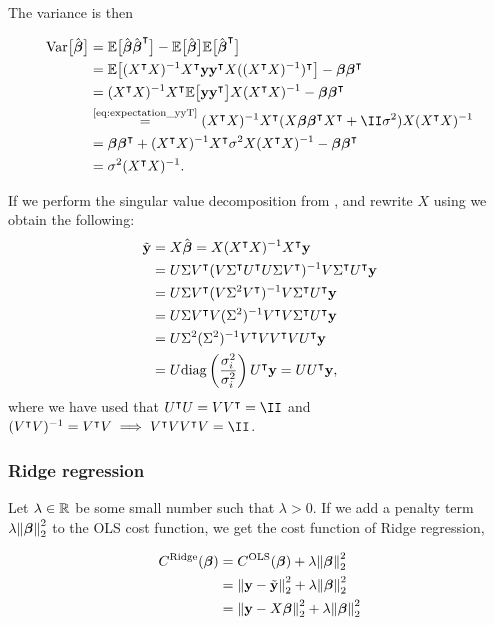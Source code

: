 The variance is then 

\begin{align}\label{eq:variance_of_optimal_beta_ols}\nonumber 
    \variance{\optbeta} &= \EE{\optbeta \optbeta\TT} -\EE{\optbeta} \EE{\optbeta\TT} \nonumber \\
    &= \EE{\invhessian X\TT  \vec{y} \vec{y}\TT X (\invhessian)\TT} - \svec{\beta} \svec{\beta}\TT \nonumber \\
    &= \invhessian X\TT \EE{ \vec{y} \vec{y}\TT } X \invhessian - \svec{\beta} \svec{\beta}\TT \nonumber \\
    &\stackrel{\text{\eqref{eq:expectation_yyT}}}{=}\invhessian X\TT ( X\svec{\beta} \svec{\beta}\TT X\TT+ \II\sigma^2) X \invhessian \nonumber \\
    &= \svec{\beta} \svec{\beta} \TT + \invhessian X\TT \sigma^2 X \invhessian - \svec{\beta} \svec{\beta} \TT \nonumber \\
    &= \sigma^2 \invhessian.
\end{align}

If we perform the singular value decomposition from , and rewrite $X$ using  we obtain the following:
\begin{align}\label{eq:ols_svd}
    \tilde{\mathbf{y}} &= X\hat{\boldsymbol{\beta}} = X(X^\intercal X)^{-1} X^\intercal \mathbf{y} \nonumber\\
    &= U\Sigma V^\intercal(V\Sigma^\intercal U^\intercal U\Sigma V^\intercal)^{-1}V\Sigma^\intercal U^\intercal\mathbf{y} \nonumber\\
    &= U\Sigma V^\intercal(V\Sigma^2V^\intercal)^{-1}V\Sigma^\intercal U^\intercal\mathbf{y}\nonumber \\
    &= U\Sigma V^\intercal V(\Sigma^2)^{-1}V^\intercal V\Sigma^\intercal U^\intercal\mathbf{y}\nonumber \\
    &= U\Sigma^2(\Sigma^2)^{-1}V^\intercal V V^\intercal VU^\intercal\mathbf{y} \nonumber\\
    &= U\text{diag}\left(\frac{\sigma_i^2}{\sigma_i^2}\right)U^\intercal\mathbf{y} = UU^\intercal\mathbf{y},
\end{align}
where we have used that $\UT U = V\VT = \II$ and $(\VT V)^{-1} = \VT V \implies \VT V \VT V = \II$. 


\subsubsection{Ridge regression}\label{sec:Ridge}

Let $\lambda \in \mathbb{R}^{}$ be some small number such that $\lambda >0$. If we add a penalty term $\lambda \norm{\boldsymbol{\beta}}_2^2$ to the OLS cost function, we get the cost function of Ridge regression,

\begin{align*}
    C^\text{Ridge}(\boldsymbol{\beta}) &=  C^\text{OLS}(\boldsymbol{\beta}) + \lambda \norm{\boldsymbol{\beta}}_2^2 \\
    &=\norm{\mathbf{y}-\tilde{\mathbf{y}}}_2^{2}  + \lambda \norm{\boldsymbol{\beta}}_2^2 \\
    &= \norm{\mathbf{y}-X\boldsymbol{\beta}}_2^{2} + \lambda \norm{\boldsymbol{\beta}}_2^2 
\end{align*}

